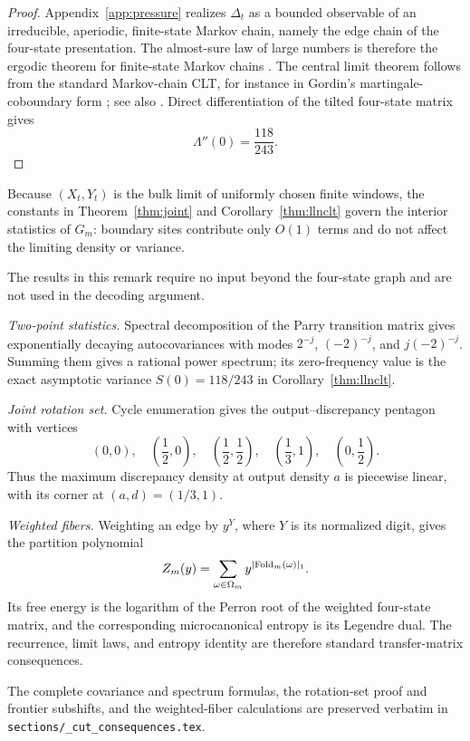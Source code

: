 \begin{proof}
Appendix~\ref{app:pressure} realizes \(\Delta_t\) as a bounded observable of an irreducible, aperiodic, finite-state Markov chain, namely the edge chain of the four-state presentation. The almost-sure law of large numbers is therefore the ergodic theorem for finite-state Markov chains \cite[Section~4]{Billingsley1961}. The central limit theorem follows from the standard Markov-chain CLT, for instance in Gordin's martingale-coboundary form \cite{Gordin1969}; see also \cite[Chapter~4]{ParryPollicott1990}. Direct differentiation of the tilted four-state matrix gives
\[
\Lambda''(0)=\frac{118}{243}.
\]
\end{proof}

Because \((X_t,Y_t)\) is the bulk limit of uniformly chosen finite windows, the constants in Theorem~\ref{thm:joint} and Corollary~\ref{thm:llnclt} govern the interior statistics of \(G_m\): boundary sites contribute only \(O(1)\) terms and do not affect the limiting density or variance.

\begin{remark}
The results in this remark require no input beyond the four-state graph and are not used in the decoding argument.

\emph{Two-point statistics.}
Spectral decomposition of the Parry transition matrix gives exponentially decaying autocovariances with modes \(2^{-j}\), \((-2)^{-j}\), and \(j(-2)^{-j}\). Summing them gives a rational power spectrum; its zero-frequency value is the exact asymptotic variance \(S(0)=118/243\) in Corollary~\ref{thm:llnclt}.

\emph{Joint rotation set.}
Cycle enumeration gives the output--discrepancy pentagon with vertices
\[
(0,0),\quad \left(\frac12,0\right),\quad
\left(\frac12,\frac12\right),\quad
\left(\frac13,1\right),\quad \left(0,\frac12\right).
\]
Thus the maximum discrepancy density at output density \(a\) is piecewise linear, with its corner at \((a,d)=(1/3,1)\).

\emph{Weighted fibers.}
Weighting an edge by \(y^Y\), where \(Y\) is its normalized digit, gives the partition polynomial
\[
Z_m(y)=\sum_{\omega\in\Omega_m}y^{|\mathrm{Fold}_m(\omega)|_1}.
\]
Its free energy is the logarithm of the Perron root of the weighted four-state matrix, and the corresponding microcanonical entropy is its Legendre dual. The recurrence, limit laws, and entropy identity are therefore standard transfer-matrix consequences.

The complete covariance and spectrum formulas, the rotation-set proof and frontier subshifts, and the weighted-fiber calculations are preserved verbatim in \texttt{sections/\_cut\_consequences.tex}.
\end{remark}
